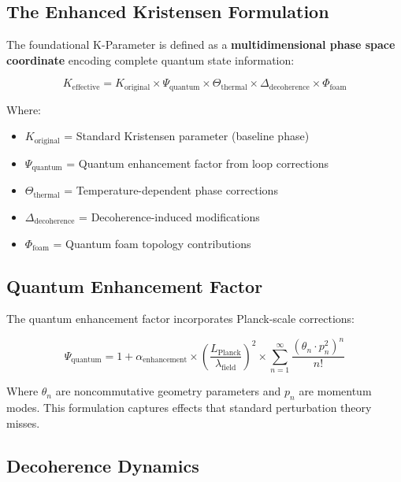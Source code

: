 \documentclass[12pt,a4paper]{article}
\begin{document}
\subsection{The Enhanced Kristensen Formulation}

The foundational K-Parameter is defined as a \textbf{multidimensional phase space coordinate}
encoding complete quantum state information:

\begin{equation}
\boxed{
K_{\text{effective}} = K_{\text{original}} \times \Psi_{\text{quantum}} \times \Theta_{\text{thermal}}
\times \Delta_{\text{decoherence}} \times \Phi_{\text{foam}}
}
\end{equation}

Where:
\begin{itemize}
    \item $K_{\text{original}}$ = Standard Kristensen parameter (baseline phase)
    \item $\Psi_{\text{quantum}}$ = Quantum enhancement factor from loop corrections
    \item $\Theta_{\text{thermal}}$ = Temperature-dependent phase corrections
    \item $\Delta_{\text{decoherence}}$ = Decoherence-induced modifications
    \item $\Phi_{\text{foam}}$ = Quantum foam topology contributions
\end{itemize}

\subsection{Quantum Enhancement Factor}

The quantum enhancement factor incorporates Planck-scale corrections:

\begin{equation}
\Psi_{\text{quantum}} = 1 + \alpha_{\text{enhancement}} \times
\left(\frac{L_{\text{Planck}}}{\lambda_{\text{field}}}\right)^2 \times
\sum_{n=1}^{\infty} \frac{(\theta_n \cdot p_n^2)^n}{n!}
\end{equation}

Where $\theta_n$ are noncommutative geometry parameters and $p_n$ are momentum modes.
This formulation captures effects that standard perturbation theory misses.

\subsection{Decoherence Dynamics}
\end{document}
